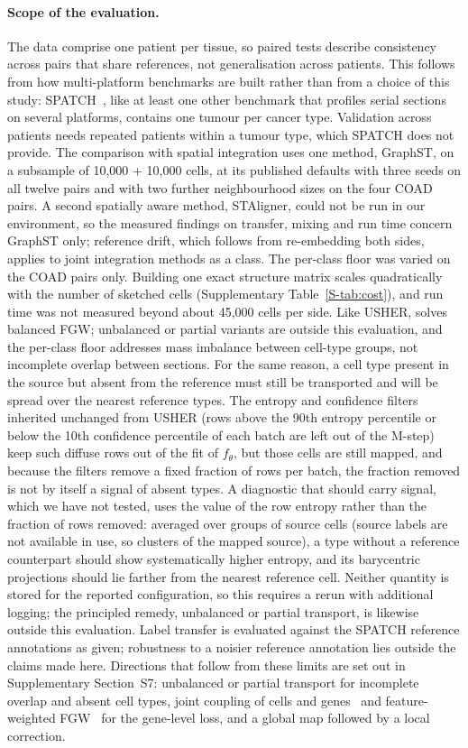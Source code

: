 \paragraph{Scope of the evaluation.}
The data comprise one patient per tissue, so paired tests describe consistency across pairs that share references,
not generalisation across patients. This follows from how multi-platform benchmarks are built rather than from a
choice of this study: SPATCH~\citep{ren2025spatch,ren2024spatchpreprint}, like at least one other benchmark that
profiles serial sections on several platforms, contains one tumour per cancer type. Validation across patients needs
repeated patients within a tumour type, which SPATCH does not provide. The comparison with spatial integration uses one method,
GraphST, on a subsample of 10{,}000 + 10{,}000 cells, at its published defaults with three seeds on all twelve
pairs and with two further neighbourhood sizes on the four COAD pairs. A second spatially aware method, STAligner,
could not be run in our environment, so the measured findings on transfer, mixing and run time concern GraphST only;
reference drift, which follows from re-embedding both sides, applies to joint integration methods as a class. The
per-class floor was varied on the COAD pairs only. Building one exact structure matrix scales quadratically with the
number of sketched cells (Supplementary Table~\ref{S-tab:cost}), and run time was not measured beyond about 45{,}000
cells per side. Like USHER, \frost solves balanced FGW; unbalanced or partial variants are outside this
evaluation, and the per-class floor addresses mass imbalance between cell-type groups, not incomplete overlap between
sections. For the same reason, a cell type present in the source but absent from the reference must still be
transported and will be spread over the nearest reference types. The entropy and confidence filters inherited
unchanged from USHER (rows above the 90th entropy percentile or below the 10th confidence percentile of each batch are
left out of the M-step) keep such diffuse rows out of the fit of $f_\theta$, but those cells are still mapped, and
because the filters remove a fixed fraction of rows per batch, the fraction removed is not by itself a signal of
absent types. A diagnostic that should carry signal, which we have not tested, uses the value of the row entropy rather than the
fraction of rows removed: averaged over groups of source cells (source labels are not available in use, so clusters
of the mapped source), a type without a reference counterpart should show systematically higher entropy, and its
barycentric projections should lie farther from the nearest reference cell. Neither quantity is stored for the
reported configuration, so this requires a rerun with additional logging; the principled remedy, unbalanced or partial
transport, is likewise outside this evaluation. Label transfer is evaluated against the SPATCH reference
annotations as given; robustness to a noisier reference annotation lies outside the claims made here.
Directions that follow from these limits are set out in Supplementary Section~S7: unbalanced or partial transport
for incomplete overlap and absent cell types, joint coupling of cells and genes~\citep{redko2020coot} and
feature-weighted FGW~\citep{lee2026fsfgw} for the gene-level loss, and a global map followed by a local correction.

